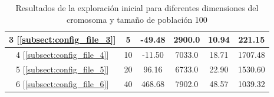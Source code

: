 \begin{table}[]
\begin{tabular}{|c|c|c|c|c|c|}
        3 [\ref{subsect:config_file_3}]                & 5                                 & -49.48                                                                                & 2900.0                                                                             & 10.94                                                                         & 221.15                                                                      \\ \hline
        4 [\ref{subsect:config_file_4}]                & 10                                & -11.50                                                                                & 7033.0                                                                             & 18.71                                                                         & 1707.48                                                                     \\ \hline
        5 [\ref{subsect:config_file_5}]                & 20                                & 96.16                                                                                 & 6733.0                                                                             & 22.90                                                                         & 1530.60                                                                     \\ \hline
        6 [\ref{subsect:config_file_6}]                & 40                                & 468.68                                                                                & 7902.0                                                                             & 48.57                                                                         & 1039.32                                                                     \\ \hline
    \end{tabular}
    \caption{Resultados de la exploración inicial para diferentes dimensiones del cromosoma y tamaño de población 100}
    \label{tab:fitness_variation}
\end{table}


